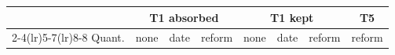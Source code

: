 \begin{tabular}{@{}l ccc ccc c@{}}
\toprule
 & \multicolumn{3}{c}{T1 absorbed} & \multicolumn{3}{c}{T1 kept} & T5 \\
\cmidrule(lr){2-4}\cmidrule(lr){5-7}\cmidrule(lr){8-8}
Quant. & none & date & reform & none & date & reform & reform \\
\midrule
\bottomrule
\end{tabular}
